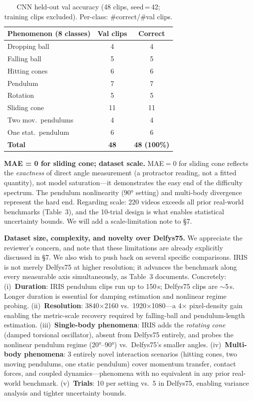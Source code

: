 \documentclass[10pt,twocolumn,letterpaper]{article}
\begin{document}
\begin{table}[h]
\centering
\caption{CNN held-out val accuracy (48 clips, seed\,=\,42; training clips excluded). Per-class: \#correct/\#val clips.}
\label{tab:cnn_val}
\small\setlength{\tabcolsep}{3pt}
\begin{tabular}{@{}lcc@{}}
\toprule
Phenomenon (8 classes) & Val clips & Correct \\
\midrule
Dropping ball          & 4  & 4 \\
Falling ball           & 5  & 5 \\
Hitting cones          & 6  & 6 \\
Pendulum               & 7  & 7 \\
Rotation               & 5  & 5 \\
Sliding cone           & 11 & 11 \\
Two mov.\ pendulums    & 4  & 4 \\
One stat.\ pendulum    & 6  & 6 \\
\midrule
\textbf{Total}         & \textbf{48} & \textbf{48 (100\%)} \\
\bottomrule
\end{tabular}
\end{table}

\noindent\textbf{MAE = 0 for sliding cone; dataset scale.}
MAE$=0$ for sliding cone reflects the \emph{exactness} of direct angle measurement (a protractor reading, not a fitted quantity), not model saturation—it demonstrates the easy end of the difficulty spectrum. The pendulum nonlinearity ($90°$ setting) and multi-body divergence represent the hard end. Regarding scale: 220 videos exceeds all prior real-world benchmarks (Table~3), and the 10-trial design is what enables statistical uncertainty bounds. We will add a scale-limitation note to \S7.

\noindent\textbf{Dataset size, complexity, and novelty over Delfys75.}
We appreciate the reviewer's concern, and note that these limitations are already explicitly discussed in \S7. We also wish to push back on several specific comparisons. IRIS is not merely Delfys75 at higher resolution; it advances the benchmark along every measurable axis simultaneously, as Table~3 documents. Concretely:
(i)~\textbf{Duration}: IRIS pendulum clips run up to 150\,s; Delfys75 clips are $\sim$5\,s. Longer duration is essential for damping estimation and nonlinear regime probing.
(ii)~\textbf{Resolution}: 3840$\times$2160 vs.\ 1920$\times$1080—a 4$\times$ pixel-density gain enabling the metric-scale recovery required by falling-ball and pendulum-length estimation.
(iii)~\textbf{Single-body phenomena}: IRIS adds the \emph{rotating cone} (damped torsional oscillator), absent from Delfys75 entirely, and probes the nonlinear pendulum regime (20°--90°) vs.\ Delfys75's smaller angles.
(iv)~\textbf{Multi-body phenomena}: 3 entirely novel interaction scenarios (hitting cones, two moving pendulums, one static pendulum) cover momentum transfer, contact forces, and coupled dynamics—phenomena with no equivalent in any prior real-world benchmark.
(v)~\textbf{Trials}: 10 per setting vs.\ 5 in Delfys75, enabling variance analysis and tighter uncertainty bounds.
\end{document}
